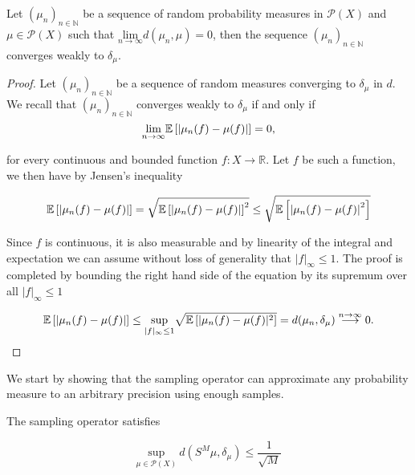 \begin{lemma}
  Let $(\mu_n)_{n \in \mathbb{N}}$ be a sequence of random probability measures in $\mathcal{P}(X)$ and $\mu \in \mathcal{P}(X)$ such that $\underset{n \rightarrow \infty}{\text{lim}} d(\mu_n, \mu) = 0$, then the sequence $(\mu_n)_{n \in \mathbb{N}}$ converges weakly to $\delta_\mu$.
\end{lemma}
\begin{proof}
  Let $(\mu_n)_{n \in \mathbb{N}}$ be a sequence of random measures converging to $\delta_\mu$ in $d$. We recall that $(\mu_n)_{n \in \mathbb{N}}$ converges weakly to $\delta_\mu$ if and only if
  \begin{equation*}
    \underset{n \rightarrow \infty}{\text{lim}}\mathbb{E}\left[\left|\mu_n(f) - \mu(f)\right|\right] = 0,
  \end{equation*}

  for every continuous and bounded function $f : X \rightarrow \mathbb{R}$. Let $f$ be such a function, we then have by Jensen's inequality

  \begin{equation*}
    \mathbb{E}\left[\left|\mu_n(f) - \mu(f)\right|\right]  = \sqrt{\mathbb{E}\left[\left|\mu_n(f) - \mu(f)\right|\right]^2} \le \sqrt{\mathbb{E}\left[\left|\mu_n(f) - \mu(f)\right|^2\right]}
  \end{equation*}

  Since $f$ is continuous, it is also  measurable and by linearity of the integral and expectation we can assume without loss of generality that $|f|_\infty \le 1$. The proof is completed by bounding the right hand side of the equation by its supremum over all $|f|_\infty \le 1$

  \begin{equation*}
    \mathbb{E}\left[\left|\mu_n(f) - \mu(f)\right|\right] \le \underset{|f|_\infty\le1}{\text{sup}} \sqrt{\mathbb{E}\left[|\mu_n(f) - \mu(f)|^2\right]} = d(\mu_n, \delta_\mu) \overset{n \rightarrow \infty}{\longrightarrow} 0.
  \end{equation*}
\end{proof}

We start by showing that the sampling operator can approximate any probability measure to an arbitrary precision using enough samples.

\begin{lemma}\label{sampling-bound}
  The sampling operator satisfies

  \begin{equation*}
    \underset{\mu \in \mathcal{P}(X)}{\text{sup}}\ d(S^M\mu, \delta_\mu) \le \frac1{\sqrt{M}}
  \end{equation*}
\end{lemma}

